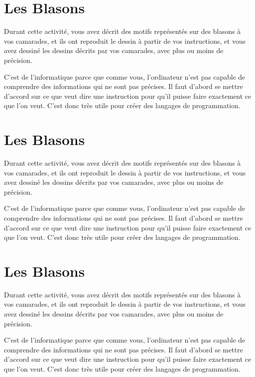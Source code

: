 \documentclass[40pt]{article}
\begin{document}
{\selectfont
\section*{Les Blasons}

\large Durant cette activité, vous avez décrit des motifs représentés sur des blasons à vos camarades, et ils ont reproduit le dessin à partir de vos instructions, et vous avez dessiné les dessins décrits par vos camarades, avec plus ou moins de précision.

C'est de l'informatique parce que comme vous, l'ordinateur n'est pas capable de comprendre des informations qui ne sont pas précises. Il faut d'abord se mettre d'accord sur ce que veut dire une instruction pour qu'il puisse faire exactement ce que l'on veut. C'est donc très utile pour créer des langages de programmation.

\section*{Les Blasons}

Durant cette activité, vous avez décrit des motifs représentés sur des blasons à vos camarades, et ils ont reproduit le dessin à partir de vos instructions, et vous avez dessiné les dessins décrits par vos camarades, avec plus ou moins de précision.

C'est de l'informatique parce que comme vous, l'ordinateur n'est pas capable de comprendre des informations qui ne sont pas précises. Il faut d'abord se mettre d'accord sur ce que veut dire une instruction pour qu'il puisse faire exactement ce que l'on veut. C'est donc très utile pour créer des langages de programmation.

\section*{Les Blasons}

\large Durant cette activité, vous avez décrit des motifs représentés sur des blasons à vos camarades, et ils ont reproduit le dessin à partir de vos instructions, et vous avez dessiné les dessins décrits par vos camarades, avec plus ou moins de précision.

C'est de l'informatique parce que comme vous, l'ordinateur n'est pas capable de comprendre des informations qui ne sont pas précises. Il faut d'abord se mettre d'accord sur ce que veut dire une instruction pour qu'il puisse faire exactement ce que l'on veut. C'est donc très utile pour créer des langages de programmation.

}
\end{document}
